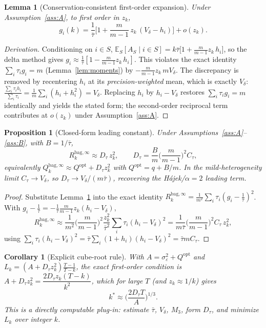 \documentclass[11pt]{article}
\newcommand{\E}{\mathbb{E}}
\newcommand{\Rk}{R_k^{\mathrm{bag},\infty}}
\newcommand{\Qopt}{Q^{\mathrm{opt}}}
\newtheorem{lemma}{Lemma}
\newtheorem{proposition}{Proposition}
\newtheorem{corollary}{Corollary}
\begin{document}
\begin{lemma}[Conservation-consistent first-order expansion]\label{lem:expand}
Under Assumption~\ref{ass:A}, to first order in $z_k$,
\[
  g_i(k)=\frac1{\bar\tau}\Big[1+\frac{m}{m-1}\,z_k\,(V_\delta-h_i)\Big]+o(z_k).
\]
\end{lemma}
\begin{proof}[Derivation]
Conditioning on $i\in S$, $\E_S[A_S\mid i\in S]=k\bar\tau\big[1+\frac{m}{m-1}z_k\,h_i\big]$,
so the delta method gives $g_i\approx\frac1{\bar\tau}[1-\frac{m}{m-1}z_k\,h_i]$. This
violates the exact identity $\sum_i\tau_ig_i=m$ (Lemma~\ref{lem:moments}) by
$-\frac{m}{m-1}z_k\,mV_\delta$. The discrepancy is removed by recentering $h_i$ at its
\emph{precision-weighted} mean, which is exactly $V_\delta$:
$\frac{\sum_i\tau_ih_i}{\sum_i\tau_i}=\frac1m\sum_i(h_i+h_i^2)=V_\delta$. Replacing $h_i$
by $h_i-V_\delta$ restores $\sum_i\tau_ig_i=m$ identically and yields the stated form; the
second-order reciprocal term contributes at $o(z_k)$ under Assumption~\ref{ass:A}.
\end{proof}

\begin{proposition}[Closed-form leading constant]\label{prop:Dtau}
Under Assumptions~\ref{ass:A}--\ref{ass:B}, with $B=1/\bar\tau$,
\[
  \Rk\approx D_\tau\,z_k^2,\qquad
  D_\tau=\frac{B}{m}\Big(\frac{m}{m-1}\Big)^2 C_\tau,
\]
equivalently $Q_k^{\mathrm{bag},\infty}\approx\Qopt+D_\tau z_k^2$ with $\Qopt=q+B/m$. In
the mild-heterogeneity limit $C_\tau\to V_\delta$, so $D_\tau\to V_\delta/(m\bar\tau)$,
recovering the H\'ajek/$\alpha=2$ leading term.
\end{proposition}
\begin{proof}
Substitute Lemma~\ref{lem:expand} into the exact identity
$\Rk=\frac1{m^2}\sum_i\tau_i(g_i-\frac1{\bar\tau})^2$. With
$g_i-\frac1{\bar\tau}=-\frac1{\bar\tau}\frac{m}{m-1}z_k(h_i-V_\delta)$,
\[
  \Rk\approx\frac1{m^2}\Big(\frac{m}{m-1}\Big)^2\frac{z_k^2}{\bar\tau^2}
  \sum_i\tau_i(h_i-V_\delta)^2
  =\frac1{m\bar\tau}\Big(\frac{m}{m-1}\Big)^2 C_\tau\,z_k^2,
\]
using $\sum_i\tau_i(h_i-V_\delta)^2=\bar\tau\sum_i(1+h_i)(h_i-V_\delta)^2=\bar\tau mC_\tau$.
\end{proof}

\begin{corollary}[Explicit cube-root rule]\label{cor:kstar-explicit}
With $A=\sigma_\varepsilon^2+\Qopt$ and $L_k=(A+D_\tau z_k^2)\frac{T-1}{T-k}$, the exact
first-order condition is $A+D_\tau z_k^2=\dfrac{2D_\tau z_k(T-k)}{k^2}$, which for large
$T$ (and $z_k\approx1/k$) gives
\[
  k^\ast\approx\Big(\frac{2D_\tau T}{A}\Big)^{1/3} .
\]
This is a directly computable plug-in: estimate $\bar\tau$, $V_\delta$, $M_3$, form
$D_\tau$, and minimize $L_k$ over integer $k$.
\end{corollary}
\end{document}
